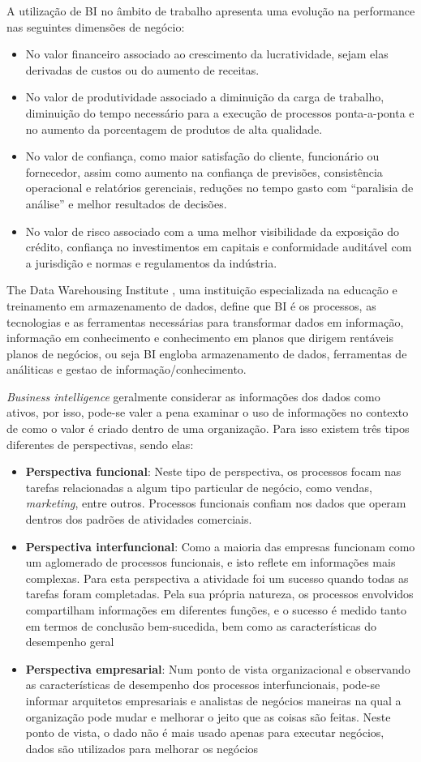 A utilização de BI no âmbito de trabalho apresenta uma evolução na performance nas seguintes dimensões de negócio:
\begin{itemize}
		\item No valor financeiro associado ao crescimento da lucratividade, sejam elas derivadas de custos ou do aumento de receitas.
		\item No valor de produtividade associado a diminuição da carga de trabalho, diminuição do tempo necessário para a execução de processos ponta-a-ponta e no aumento da porcentagem de produtos de alta qualidade.
		\item No valor de confiança, como maior satisfação do cliente, funcionário ou fornecedor, assim como aumento na confiança de previsões, consistência operacional e relatórios gerenciais, reduções no tempo gasto com “paralisia de análise” e melhor resultados de decisões.
		\item No valor de risco associado com a uma melhor visibilidade da exposição do crédito, confiança no investimentos em capitais e conformidade auditável com a jurisdição e normas e regulamentos da indústria.
\end{itemize}
The Data Warehousing Institute \cite{tdwi}, uma instituição especializada na educação e treinamento em armazenamento de dados, define que BI é os processos, as tecnologias e as ferramentas necessárias para transformar dados em informação, informação em conhecimento e conhecimento em planos que dirigem rentáveis planos de negócios, ou seja BI engloba armazenamento de dados, ferramentas de análiticas e gestao de informação/conhecimento. 

\textit{Business intelligence} geralmente considerar as informações dos dados como ativos, por isso, pode-se valer a pena examinar o uso de informações no contexto de como o valor é criado dentro de uma organização. Para isso existem três tipos diferentes de perspectivas, sendo elas:
\begin{itemize}
		\item \textbf{Perspectiva funcional}: Neste tipo de perspectiva, os processos focam nas tarefas relacionadas a algum tipo particular de negócio, como vendas, \textit{marketing}, entre outros. Processos funcionais confiam nos dados que operam dentros dos padrões de atividades comerciais.
		\item \textbf{Perspectiva interfuncional}: Como a maioria das empresas funcionam como um aglomerado de processos funcionais, e isto reflete em informações mais complexas. Para esta perspectiva a atividade foi um sucesso quando todas as tarefas foram completadas. Pela sua própria natureza, os processos envolvidos compartilham informações em diferentes funções, e o sucesso é medido tanto em termos de conclusão bem-sucedida, bem como as características do desempenho geral
		\item \textbf{Perspectiva empresarial}: Num ponto de vista organizacional e observando as características de desempenho dos processos interfuncionais, pode-se informar arquitetos empresariais e analistas de negócios maneiras na qual a organização pode mudar e melhorar o jeito que as coisas são feitas. Neste ponto de vista, o dado não é mais usado apenas para executar negócios, dados são utilizados para melhorar os negócios
\end{itemize}

